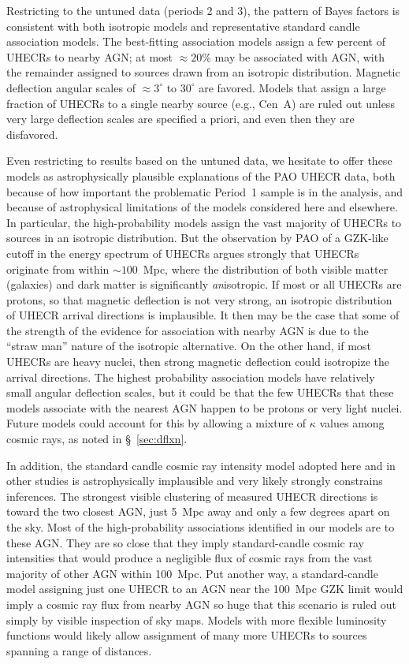 Restricting to the untuned data (periods 2 and 3), the pattern of Bayes
factors is consistent with both isotropic models and representative standard
candle association models.
The best-fitting association models assign a few percent of UHECRs to nearby
AGN; at most $\approx 20$\% may be associated with AGN, with the remainder
assigned to sources drawn from an isotropic distribution.
Magnetic deflection angular scales of $\approx 3^\circ$
to $30^\circ$ are favored.
Models that assign a large fraction of UHECRs to a single nearby source (e.g.,
Cen~A) are ruled out unless very large deflection scales are specified a
priori, and even then they are disfavored.

Even restricting to results based on the untuned data, we hesitate to offer
these models as astrophysically plausible explanations of the PAO UHECR
data, both because of how important the problematic Period~1 sample is in
the analysis, and because of astrophysical limitations of the models
considered here and elsewhere.  In particular, the high-probability models
assign the vast majority of UHECRs to sources in an isotropic distribution.
But the observation by PAO of a GZK-like cutoff in the energy spectrum of
UHECRs argues strongly that UHECRs originate from within $\sim 100$~Mpc,
where the distribution of both visible matter (galaxies) and dark matter is
significantly {\em an}isotropic.  If most or all UHECRs are protons, so that
magnetic deflection is not very strong, an isotropic distribution of UHECR
arrival directions is implausible.  It then may be the case that some of the
strength of the evidence for association with nearby AGN is due to the
``straw man'' nature of the isotropic alternative.  On the other hand, if
most UHECRs are heavy nuclei, then strong magnetic deflection could
isotropize the arrival directions.  The highest probability association
models have relatively small angular deflection scales, but it could be that
the few UHECRs that these models associate with the nearest AGN happen to be
protons or very light nuclei.  Future models could account for this by
allowing a mixture of $\kappa$ values among cosmic rays, as noted in
\S~\ref{sec:dflxn}.

In addition, the standard candle cosmic ray intensity model adopted here and
in other studies is astrophysically implausible and very likely strongly
constrains inferences.  The strongest visible clustering of measured UHECR
directions is toward the two closest AGN, just 5~Mpc away and only a few
degrees apart on the sky.  Most of the high-probability associations
identified in our models are to these AGN.  They are so close that they
imply standard-candle cosmic ray intensities that would produce a negligible
flux of cosmic rays from the vast majority of other AGN within 100~Mpc.  Put
another way, a standard-candle model assigning just one UHECR to an AGN near
the 100~Mpc GZK limit would imply a cosmic ray flux from nearby AGN so huge
that this scenario is ruled out simply by visible inspection of sky maps. 
Models with more flexible luminosity functions would likely allow assignment
of many more UHECRs to sources spanning a range of distances.


